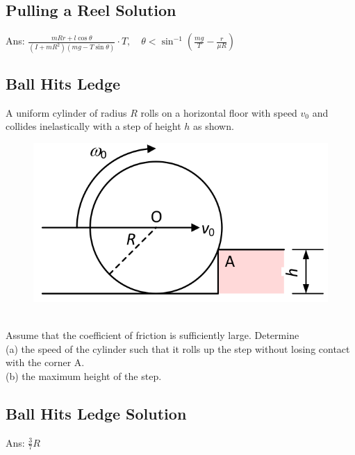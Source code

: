 \documentclass{article}
\begin{document}
\subsection{Pulling a Reel Solution}
Ans: $\frac{m R r+l \cos \theta}{\left(I+m R^2\right)(m g-T \sin \theta)} \cdot T,\quad \theta<\sin ^{-1}\left(\frac{m g}{T}-\frac{r}{\mu R}\right)$
\clearpage
\subsection{Ball Hits Ledge }
A uniform cylinder of radius $R$ rolls on a horizontal floor with speed $v_0$ and collides inelastically with a step of height $h$ as shown.
\begin{figure}[h]
    \centering
\includegraphics[width=0.6\linewidth]{images/ballhitsledge.png}
\end{figure}\\
Assume that the coefficient of friction is sufficiently large. Determine\\
\noindent (a) the speed of the cylinder such that it rolls up the step without losing contact with the corner A.\\
\noindent (b) the maximum height of the step.

\clearpage
\subsection{Ball Hits Ledge Solution}
Ans: $\frac{3}{7} R$ 
\clearpage
\end{document}
